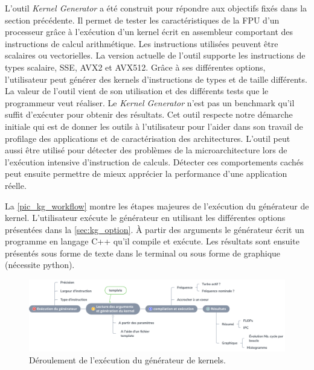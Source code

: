             L'outil \textit{Kernel Generator} a été construit pour répondre aux objectifs fixés dans la section précédente. Il permet de tester les caractéristiques de la FPU d'un processeur grâce à l'exécution d'un kernel écrit en assembleur comportant des instructions de calcul arithmétique. Les instructions utilisées peuvent être scalaires ou vectorielles. La version actuelle de l'outil supporte les instructions de types scalaire, SSE, AVX2 et AVX512. 
            Grâce à ses différentes options, l'utilisateur peut générer des kernels d'instructions de types et de taille différents. La valeur de l'outil vient de son utilisation et des différents tests que le programmeur veut réaliser. Le \textit{Kernel Generator} n'est pas un benchmark qu'il suffit d'exécuter pour obtenir des résultats. Cet outil respecte notre démarche initiale qui est de donner les outils à l'utilisateur pour l'aider dans son travail de profilage des applications et de caractérisation des architectures. 
            L'outil peut aussi être utilisé pour détecter des problèmes de la microarchitecture lors de l'exécution intensive d'instruction de calculs. Détecter ces comportements cachés peut ensuite permettre de mieux apprécier la performance d'une application réelle. 
        
     
        
            La \autoref{pic_kg_workflow} montre les étapes majeures de l'exécution du générateur de kernel. L'utilisateur exécute le générateur en utilisant les différentes options présentées dans la \autoref{sec:kg_option}. À partir des arguments le générateur écrit un programme en langage C++ qu'il compile et exécute. Les résultats sont ensuite présentés sous forme de texte dans le terminal ou sous forme de graphique (nécessite python). 
        
    
            \begin{figure}
            \center
            \includegraphics[width=16cm]{images/kg_workflow.png}
            \caption{\label{pic_kg_workflow} Déroulement de l'exécution du générateur de kernels.}
            \end{figure}
    
